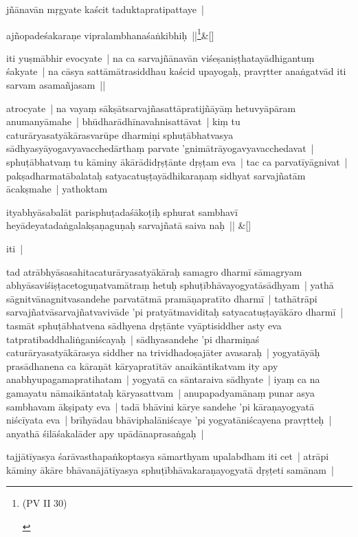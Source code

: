 \documentclass[article,12pt,a4paper]{memoir}
\begin{document}
	  \pstart jñānavān mṛgyate kaścit taduktapratipattaye | 
	\pend
      
	    
	    \stanza[\smallbreak]
	ajñopadeśakaraṇe vipralambhanaśaṅkibhiḥ ||\footnote{\begin{english}(PV II 30)\end{english}}\&[\smallbreak]


	

	  \pstart iti yuṣmābhir evocyate | na ca sarvajñānavān viśeṣaniṣṭhatayādhigantuṃ śakyate | na cāsya sattāmātrasiddhau kaścid upayogaḥ, pravṛtter anaṅgatvād iti sarvam asamañjasam || 
	\pend
      

	  \pstart atrocyate | na vayaṃ sākṣātsarvajñasattāpratijñāyāṃ hetuvyāpāram anumanyāmahe | bhūdharādhīnavahnisattāvat | kiṃ tu caturāryasatyākārasvarūpe dharmiṇi sphuṭābhatvasya sādhyasyāyogavyavacchedārthaṃ parvate 'gnimātrāyogavyavacchedavat | sphuṭābhatvaṃ tu kāminy ākārādidṛṣṭānte dṛṣṭam eva | tac ca parvatīyāgnivat | pakṣadharmatābalataḥ satyacatuṣṭayādhikaraṇaṃ sidhyat sarvajñatām ācakṣmahe | yathoktam 
	\pend
      
	    
	    \stanza[\smallbreak]
	ityabhyāsabalāt parisphuṭadaśākoṭiḥ sphurat sambhavī heyādeyatadaṅgalakṣaṇaguṇaḥ sarvajñatā saiva naḥ || \&[\smallbreak]


	

	  \pstart iti | 
	\pend
      

	  \pstart tad atrābhyāsasahitacaturāryasatyākāraḥ samagro dharmī sāmagryam abhyāsaviśiṣṭacetoguṇatvamātraṃ hetuḥ sphuṭībhāvayogyatāsādhyam | yathā sāgnitvānagnitvasandehe parvatātmā pramāṇapratīto dharmī | tathātrāpi sarvajñatvāsarvajñatvavivāde 'pi pratyātmaviditaḥ satyacatuṣṭayākāro dharmī | tasmāt sphuṭābhatvena sādhyena dṛṣṭānte vyāptisiddher asty eva tatpratibaddhaliṅganiścayaḥ | sādhyasandehe 'pi dharmiṇaś caturāryasatyākārasya siddher na trividhadoṣajāter avasaraḥ | yogyatāyāḥ prasādhanena ca kāraṇāt kāryapratītāv anaikāntikatvam ity apy anabhyupagamapratihatam | yogyatā ca sāntaraiva sādhyate | iyaṃ ca na gamayatu nāmaikāntataḥ kāryasattvam | anupapadyamānaṃ punar asya sambhavam ākṣipaty eva | tadā bhāvini kārye sandehe 'pi kāraṇayogyatā niścīyata eva | brīhyādau bhāviphalāniścaye 'pi yogyatāniścayena pravṛtteḥ | anyathā śilāśakalāder apy upādānaprasaṅgaḥ | 
	\pend
      

	  \pstart tajjātīyasya śarāvasthapaṅkoptasya sāmarthyam upalabdham iti cet | atrāpi kāminy ākāre bhāvanājātīyasya sphuṭībhāvakaraṇayogyatā dṛṣṭeti samānam | 
	\pend
      
\end{document}

